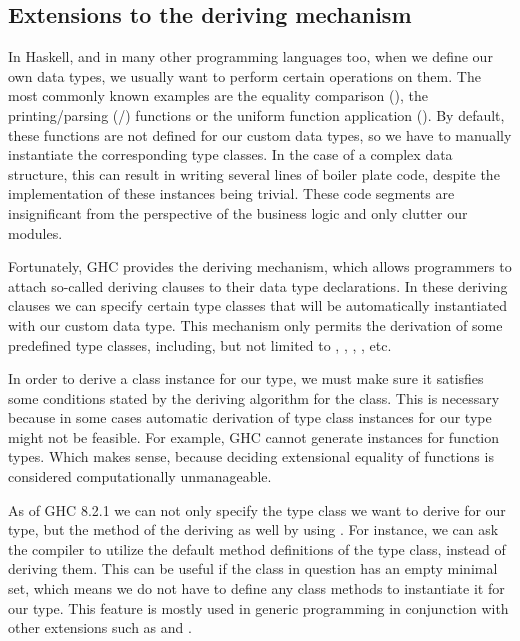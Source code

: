 \documentclass[main.tex]{subfiles}
\begin{document}
	\subsection{Extensions to the deriving mechanism}
	
	In Haskell, and in many other programming languages too, when we define our own data types, we usually want to perform certain operations on them. The most commonly known examples are the equality comparison (), the printing/parsing (/) functions or the uniform function application (). By default, these functions are not defined for our custom data types, so we have to manually instantiate the corresponding type classes. In the case of a complex data structure, this can result in writing several lines of boiler plate code, despite the implementation of these instances being trivial. These code segments are insignificant from the perspective of the business logic and only clutter our modules.
	
	Fortunately, GHC provides the deriving mechanism, which allows programmers to attach so-called deriving clauses to their data type declarations. In these deriving clauses we can specify certain type classes that will be automatically instantiated with our custom data type. This mechanism only permits the derivation of some predefined type classes, including, but not limited to , , , ,  etc.
	
	In order to derive a class instance for our type, we must make sure it satisfies some conditions stated by the deriving algorithm for the class. This is necessary because in some cases automatic derivation of type class instances for our type might not be feasible. For example, GHC cannot generate  instances for function types. Which makes sense, because deciding extensional equality of functions is considered computationally unmanageable.
	
	As of GHC 8.2.1 we can not only specify the type class we want to derive for our type, but the method of the deriving as well by using . For instance, we can ask the compiler to utilize the default method definitions of the type class, instead of deriving them. This can be useful if the class in question has an empty minimal set, which means we do not have to define any class methods to instantiate it for our type. This feature is mostly used in generic programming in conjunction with other extensions such as  and .
	
\end{document}

